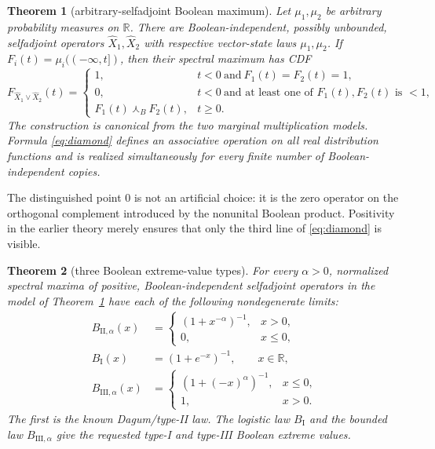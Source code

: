 \documentclass[11pt]{article}
\newtheorem{theorem}{Theorem}
\newcommand{\Bmeet}{\mathbin{\curlywedge_{\!B}}}
\begin{document}
\begin{theorem}[arbitrary-selfadjoint Boolean maximum]\label{thm:model}
Let $\mu_1,\mu_2$ be arbitrary probability measures on $\mathbb R$.  There
are Boolean-independent, possibly unbounded, selfadjoint operators
$\widehat X_1,\widehat X_2$ with respective vector-state laws
$\mu_1,\mu_2$.  If $F_i(t)=\mu_i(({-\infty},t])$, then their spectral maximum
has CDF
\begin{equation}\label{eq:diamond}
F_{\widehat X_1\vee\widehat X_2}(t)=
\begin{cases}
1,&t<0\ \text{and}\ F_1(t)=F_2(t)=1,\\
0,&t<0\ \text{and at least one of }F_1(t),F_2(t)\text{ is }<1,\\
F_1(t)\Bmeet F_2(t),&t\geq0.
\end{cases}
\end{equation}
The construction is canonical from the two marginal multiplication models.
Formula \eqref{eq:diamond} defines an associative operation on all real
distribution functions and is realized simultaneously for every finite
number of Boolean-independent copies.
\end{theorem}

The distinguished point $0$ is not an artificial choice: it is the zero
operator on the orthogonal complement introduced by the nonunital Boolean
product.  Positivity in the earlier theory merely ensures that only the third
line of \eqref{eq:diamond} is visible.

\begin{theorem}[three Boolean extreme-value types]\label{thm:types}
For every $\alpha>0$, normalized spectral maxima of positive,
Boolean-independent selfadjoint operators in the model of
Theorem~\ref{thm:model} have each of the following nondegenerate limits:
\begin{align*}
B_{\mathrm{II},\alpha}(x)
 &=\begin{cases}(1+x^{-\alpha})^{-1},&x>0,\\0,&x\leq0,
 \end{cases}\\[2pt]
B_{\mathrm I}(x)&=(1+e^{-x})^{-1},\qquad x\in\mathbb R,\\[2pt]
B_{\mathrm{III},\alpha}(x)
 &=\begin{cases}(1+(-x)^\alpha)^{-1},&x\leq0,\\1,&x>0.
 \end{cases}
\end{align*}
The first is the known Dagum/type-II law.  The logistic law $B_{\mathrm I}$
and the bounded law $B_{\mathrm{III},\alpha}$ give the requested type-I and
type-III Boolean extreme values.
\end{theorem}
\end{document}
